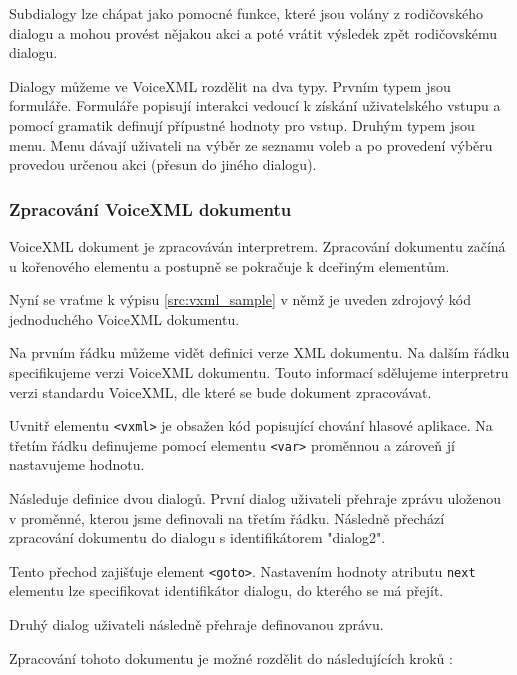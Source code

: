 \documentclass[ing,male,java,dept460,twoside]{diploma}						%
\begin{document}
Subdialogy lze chápat jako pomocné funkce, které jsou volány z rodičovského dialogu a mohou provést nějakou akci a poté vrátit výsledek zpět rodičovskému dialogu.

Dialogy můžeme ve VoiceXML rozdělit na dva typy. Prvním typem jsou formuláře. Formuláře popisují interakci vedoucí k získání uživatelského vstupu a pomocí gramatik definují přípustné hodnoty pro vstup. Druhým typem jsou menu. Menu dávají uživateli na výběr ze seznamu voleb a po provedení výběru provedou určenou akci (přesun do jiného dialogu).



\subsubsection{Zpracování VoiceXML dokumentu}
\label{sec:Zpracovani_vxml_dokumentu}
VoiceXML dokument je zpracováván interpretrem. Zpracování dokumentu začíná u kořenového elementu a postupně se pokračuje k dceřiným elementům.

Nyní se vraťme k výpisu \ref{src:vxml_sample} v němž je uveden zdrojový kód jednoduchého VoiceXML dokumentu.

Na prvním řádku můžeme vidět definici verze XML dokumentu. Na dalším řádku specifikujeme verzi VoiceXML dokumentu. Touto informací sdělujeme interpretru verzi standardu VoiceXML, dle které se bude dokument zpracovávat.

Uvnitř elementu \texttt{<vxml>} je obsažen kód popisující chování hlasové aplikace. Na třetím řádku definujeme pomocí elementu \texttt{<var>} proměnnou a zároveň jí nastavujeme hodnotu.

Následuje definice dvou dialogů. První dialog uživateli přehraje zprávu uloženou v proměnné, kterou jsme definovali na třetím řádku. Následně přechází zpracování dokumentu do dialogu s identifikátorem "dialog2".

Tento přechod zajišťuje element \texttt{<goto>}. Nastavením hodnoty atributu \texttt{next} elementu lze specifikovat identifikátor dialogu, do kterého se má přejít.

Druhý dialog uživateli následně přehraje definovanou zprávu.

Zpracování tohoto dokumentu je možné rozdělit do následujících kroků \cite{vxmldevguide}:
\end{document}
